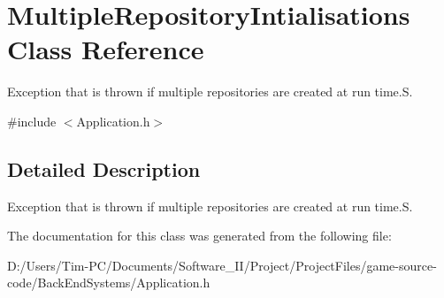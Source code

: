 \hypertarget{class_multiple_repository_intialisations}{}\section{Multiple\+Repository\+Intialisations Class Reference}
\label{class_multiple_repository_intialisations}


Exception that is thrown if multiple repositories are created at run time.\+S.  




{\ttfamily \#include $<$Application.\+h$>$}



\subsection{Detailed Description}
Exception that is thrown if multiple repositories are created at run time.\+S. 

The documentation for this class was generated from the following file\+:\begin{DoxyCompactItemize}
\item 
D\+:/\+Users/\+Tim-\/\+P\+C/\+Documents/\+Software\+\_\+\+I\+I/\+Project/\+Project\+Files/game-\/source-\/code/\+Back\+End\+Systems/Application.\+h\end{DoxyCompactItemize}
